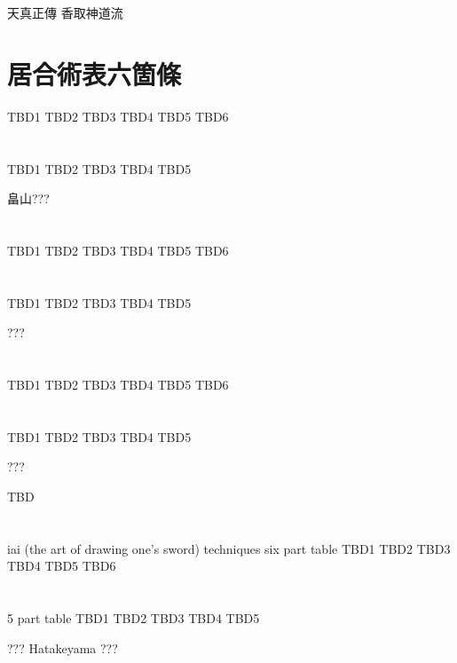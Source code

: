 \documentclass[dvipdfmx, a4paper, 12pt]{utarticle}
\begin{document}
\begin{CJK*}{UTF8}{min}
\CJKtilde
\begin{landscape}

\newpage
\pagestyle{empty}
天真正傳
香取神道流
\section{居合術表六箇條}
TBD1
TBD2
TBD3
TBD4
TBD5
TBD6
\section{}
TBD1
TBD2
TBD3
TBD4
TBD5

畠山???

\newpage
\pagestyle{empty}
\section{}
TBD1
TBD2
TBD3
TBD4
TBD5
TBD6
\section{}
TBD1
TBD2
TBD3
TBD4
TBD5

???

\newpage
\pagestyle{empty}
\section{}
TBD1
TBD2
TBD3
TBD4
TBD5
TBD6
\section{}
TBD1
TBD2
TBD3
TBD4
TBD5

???

\newpage
\pagestyle{empty}
TBD
\section{}
iai (the art of drawing one's sword) techniques six part table
TBD1
TBD2
TBD3
TBD4
TBD5
TBD6
\section{}
5 part table
TBD1
TBD2
TBD3
TBD4
TBD5

???
Hatakeyama ???

\end{landscape}
\end{CJK*}
\end{document}
